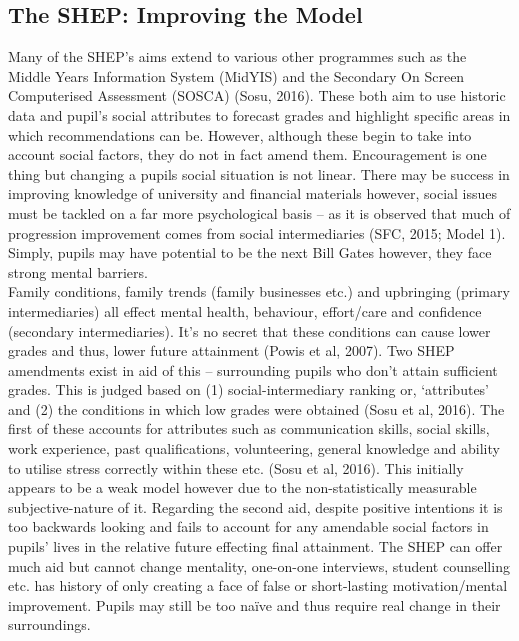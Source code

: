 \documentclass[11pt, english]{article}
\begin{document}
	\subsection{The SHEP: Improving the Model}

	Many of the SHEP’s aims extend to various other programmes such as the Middle Years Information System (MidYIS) and the Secondary On Screen Computerised Assessment (SOSCA) (Sosu, 2016). These both aim to use historic data and pupil’s social attributes to forecast grades and highlight specific areas in which recommendations can be. However, although these begin to take into account social factors, they do not in fact amend them. Encouragement is one thing but changing a pupils social situation is not linear. There may be success in improving knowledge of university and financial materials however, social issues must be tackled on a far more psychological basis – as it is observed that much of progression improvement comes from social intermediaries (SFC, 2015; Model 1). Simply, pupils may have potential to be the next Bill Gates however, they face strong mental barriers.\\

	Family conditions, family trends (family businesses etc.) and upbringing (primary intermediaries) all effect mental health, behaviour, effort/care and confidence (secondary intermediaries). It’s no secret that these conditions can cause lower grades and thus, lower future attainment (Powis et al, 2007). Two SHEP amendments exist in aid of this – surrounding pupils who don’t attain sufficient grades. This is judged based on (1) social-intermediary ranking or, ‘attributes’ and (2) the conditions in which low grades were obtained (Sosu et al, 2016). The first of these accounts for attributes such as communication skills, social skills, work experience, past qualifications, volunteering, general knowledge and ability to utilise stress correctly within these etc. (Sosu et al, 2016). This initially appears to be a weak model however due to the non-statistically measurable subjective-nature of it. Regarding the second aid, despite positive intentions it is too backwards looking and fails to account for any amendable social factors in pupils’ lives in the relative future effecting final attainment. The SHEP can offer much aid but cannot change mentality, one-on-one interviews, student counselling etc. has history of only creating a face of false or short-lasting motivation/mental improvement. Pupils may still be too naïve and thus require real change in their surroundings.
\end{document}
